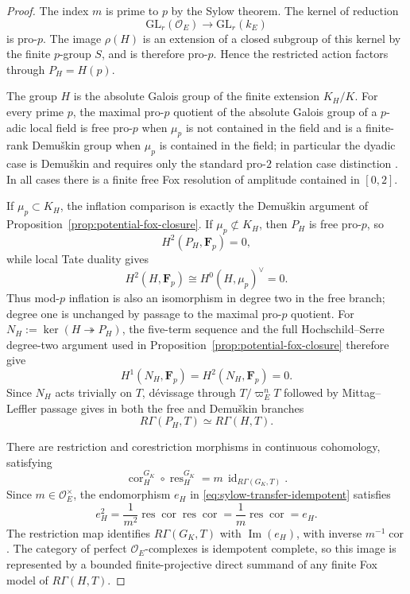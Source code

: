 \documentclass[11pt]{article}
\theoremstyle{definition}
\begin{document}
\begin{proof}
The index $m$ is prime to $p$ by the Sylow theorem.  The kernel of reduction
\[
\mathrm{GL}_r(\mathcal O_E)\longrightarrow \mathrm{GL}_r(k_E)
\]
is pro-$p$.  The image $\rho(H)$ is an extension of a closed subgroup of this kernel by the finite $p$-group $S$, and is therefore pro-$p$.  Hence the restricted action factors through $P_H=H(p)$.

The group $H$ is the absolute Galois group of the finite extension $K_H/K$.  For every prime $p$, the maximal pro-$p$ quotient of the absolute Galois group of a $p$-adic local field is free pro-$p$ when $\mu_p$ is not contained in the field and is a finite-rank Demu\v{s}kin group when $\mu_p$ is contained in the field; in particular the dyadic case is Demu\v{s}kin and requires only the standard pro-$2$ relation case distinction \cite{NSW,JardenShusterman}.  In all cases there is a finite free Fox resolution of amplitude contained in $[0,2]$.

If $\mu_p\subset K_H$, the inflation comparison is exactly the Demu\v{s}kin argument of Proposition~\ref{prop:potential-fox-closure}.  If $\mu_p\not\subset K_H$, then $P_H$ is free pro-$p$, so
\[
H^2(P_H,\mathbf F_p)=0,
\]
while local Tate duality gives
\[
H^2(H,\mathbf F_p)
\cong H^0(H,\mu_p)^\vee
=0.
\]
Thus mod-$p$ inflation is also an isomorphism in degree two in the free branch; degree one is unchanged by passage to the maximal pro-$p$ quotient.  For $N_H:=\ker(H\twoheadrightarrow P_H)$, the five-term sequence and the full Hochschild--Serre degree-two argument used in Proposition~\ref{prop:potential-fox-closure} therefore give
\[
H^1(N_H,\mathbf F_p)=H^2(N_H,\mathbf F_p)=0.
\]
Since $N_H$ acts trivially on $T$, d\'evissage through $T/\varpi_E^nT$ followed by Mittag--Leffler passage gives in both the free and Demu\v{s}kin branches
\[
R\Gamma(P_H,T)\simeq R\Gamma(H,T).
\]

There are restriction and corestriction morphisms in continuous cohomology, satisfying
\[
\operatorname{cor}_{H}^{G_K}\circ
\operatorname{res}_{H}^{G_K}
=m\,\operatorname{id}_{R\Gamma(G_K,T)}.
\]
Since $m\in\mathcal O_E^\times$, the endomorphism $e_H$ in \eqref{eq:sylow-transfer-idempotent} satisfies
\[
e_H^2
=\frac1{m^2}\operatorname{res}\operatorname{cor}
\operatorname{res}\operatorname{cor}
=\frac1m\operatorname{res}\operatorname{cor}
=e_H.
\]
The restriction map identifies $R\Gamma(G_K,T)$ with $\operatorname{Im}(e_H)$, with inverse $m^{-1}\operatorname{cor}$.  The category of perfect $\mathcal O_E$-complexes is idempotent complete, so this image is represented by a bounded finite-projective direct summand of any finite Fox model of $R\Gamma(H,T)$.
\end{proof}
\end{document}
